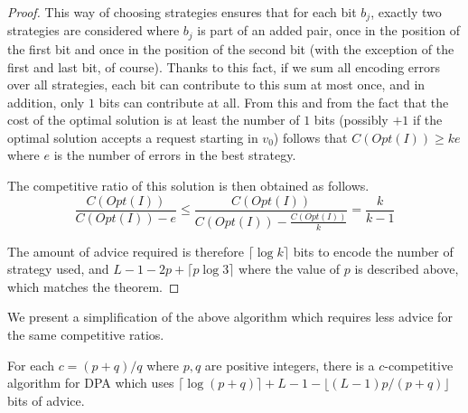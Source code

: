 \begin{proof}
    This way of choosing strategies ensures that for each bit $b_j$,
    exactly two strategies are considered where $b_j$ is part of an added
    pair, once in the position of the first bit and once in the position
    of the second bit (with the exception of the first and last bit, of
    course). Thanks to this fact, if we sum all encoding errors over all
    strategies, each bit can contribute to this sum at most once, and in
    addition, only $1$ bits can contribute at all. From this and from the
    fact that the cost of the optimal solution is at least the number of
    $1$ bits (possibly $+1$ if the optimal solution accepts a request
    starting in $v_0$) follows that $C(Opt(I)) \geq ke$ where $e$ is the
    number of errors in the best strategy.

    The competitive ratio of this solution is then obtained as follows.
    $$
        \frac{C(Opt(I))}{C(Opt(I)) - e} \leq \frac{C(Opt(I))}{C(Opt(I)) -
        \frac{C(Opt(I))}{k}} = \frac{k}{k-1}
    $$

    The amount of advice required is therefore $\lceil\log{}k\rceil$ bits
    to encode the number of strategy used, and $L - 1 - 2p +
    \lceil{}p\log{}3\rceil$ where the value of $p$ is described above,
    which matches the theorem.
\end{proof}

We present a simplification of the above algorithm which requires less
advice for the same competitive ratios.

\begin{theorem}\label{theorem:dpa-fraction}
    For each $c = (p+q)/q$ where $p, q$ are positive integers, there is a
    $c$-competitive algorithm for DPA which uses $\lceil\log(p+q)\rceil +
    L - 1 - \lfloor (L-1) p / (p + q)\rfloor$ bits of advice.
\end{theorem}

